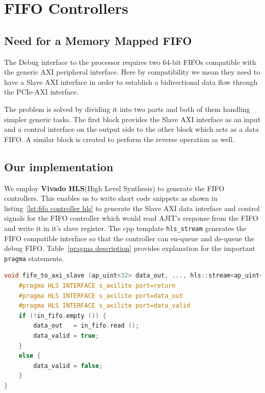 \section{FIFO Controllers}

\subsection{Need for a Memory Mapped FIFO}

The Debug interface to the processor requires two 64-bit FIFOs compatible with the generic AXI peripheral interface. Here by compatibility
we mean they need to have a Slave AXI interface in order to establish a bidirectional data flow through the PCIe-AXI interface.

The problem is solved by dividing it into two parts and both of them handling simpler generic tasks. The first block provides the Slave AXI
interface as an input and a control interface on the output side to the other block which acts as a data FIFO. A similar block is created to
perform the reverse operation as well.

\subsection{Our implementation}

We employ \textbf{Vivado HLS}(High Level Synthesis) to generate the FIFO controllers. This enables us to write short code snippets as shown
in listing~\ref{lst:fifo controller hls} to generate the Slave AXI data interface and control signals for the FIFO controller which would
read AJIT's response from the FIFO and write it in it's slave register. The cpp template \verb|hls_stream| generates the FIFO compatible
interface so that the controller can en-queue and de-queue the debug FIFO.  Table~\ref{pragma description} provides explanation for the important
\verb|pragma| statements.

\pagebreak

\scriptsize
\singlespacing
\begin{lstlisting}[language=C++, caption=FIFO Controller HLS, label={lst:fifo controller hls}]
void fifo_to_axi_slave (ap_uint<32> data_out, ..., hls::stream<ap_uint<32> > &in_fifo) {
    #pragma HLS INTERFACE s_axilite port=return
    #pragma HLS INTERFACE s_axilite port=data_out
    #pragma HLS INTERFACE s_axilite port=data_valid
    if (!in_fifo.empty ()) {
        data_out   = in_fifo.read ();
        data_valid = true;
    }
    else {
        data_valid = false;
    }
}
\end{lstlisting}

